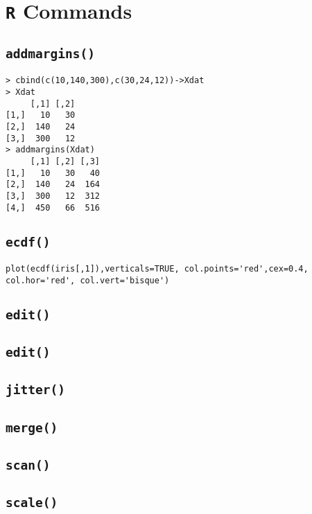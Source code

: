 \documentclass[a4paper,12pt]{article}
\begin{document}
\tableofcontents
\newpage
\section{\texttt{R} Commands}
\subsection{\texttt{addmargins()}}
\begin{framed}
\begin{verbatim}
> cbind(c(10,140,300),c(30,24,12))->Xdat
> Xdat
     [,1] [,2]
[1,]   10   30
[2,]  140   24
[3,]  300   12
> addmargins(Xdat)
     [,1] [,2] [,3]
[1,]   10   30   40
[2,]  140   24  164
[3,]  300   12  312
[4,]  450   66  516
\end{verbatim}
\end{framed}
\subsection{\texttt{ecdf()}}
\begin{framed}
\begin{verbatim}
plot(ecdf(iris[,1]),verticals=TRUE, col.points='red',cex=0.4, col.hor='red', col.vert='bisque')
\end{verbatim}
\end{framed}
\subsection{\texttt{edit()}}
\subsection{\texttt{edit()}}
\subsection{\texttt{jitter()}}
\subsection{\texttt{merge()}}
\subsection{\texttt{scan()}}
\subsection{\texttt{scale()}}
\end{document}
